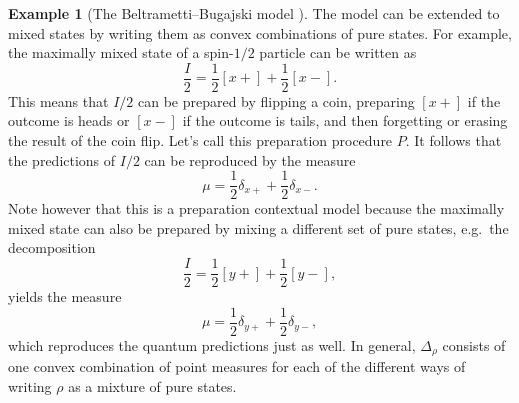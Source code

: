 \documentclass[DIV=calc,fontsize=12pt]{scrartcl} %
\theoremstyle{definition}
\newtheorem{example}[definition]{Example}
\theoremstyle{plain}
\newcommand{\Proj}[1]{\ensuremath{\left [ #1 \right ]}}
\begin{document}
\begin{example}[The Beltrametti--Bugajski model \cite{Beltrametti1995}]
The model can be extended to mixed states by writing them as convex
combinations of pure states.  For example, the maximally mixed state
of a spin-$1/2$ particle can be written as
\begin{equation}
\frac{I}{2} = \frac{1}{2} \Proj{x+} + \frac{1}{2} \Proj{x-}.
\end{equation}
This means that $I/2$ can be prepared by flipping a coin, preparing
$\Proj{x+}$ if the outcome is heads or $\Proj{x-}$ if the outcome is
tails, and then forgetting or erasing the result of the coin flip.
Let's call this preparation procedure $P$.  It follows that the
predictions of $I/2$ can be reproduced by the measure
\begin{equation}
\mu = \frac{1}{2}\delta_{x+} + \frac{1}{2}\delta_{x-}.
\end{equation}
Note however that this is a preparation contextual model because the
maximally mixed state can also be prepared by mixing a different set
of pure states, e.g.\ the decomposition
\begin{equation}
\frac{I}{2} = \frac{1}{2} \Proj{y+} + \frac{1}{2} \Proj{y-},
\end{equation}
yields the measure
\begin{equation}
\mu = \frac{1}{2}\delta_{y+} + \frac{1}{2}\delta_{y-},
\end{equation}
which reproduces the quantum predictions just as well.  In general,
$\Delta_{\rho}$ consists of one convex combination of point measures
for each of the different ways of writing $\rho$ as a mixture of
pure states.
\end{example}
\end{document}
